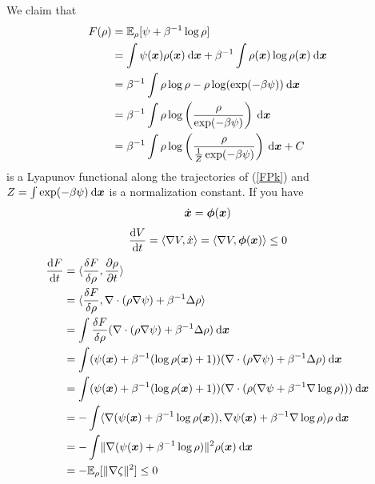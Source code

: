 \documentclass[11pt,twoside,a4paper]{article}
\begin{document}
We claim that 
\begin{align}
    F(\rho) &= \mathbb{E}_{\rho}[\psi + \beta^{-1} \log \rho ] \nonumber \\ 
    & = \int \psi({\bm{x}}) \rho({\bm{x}}) \: {\rm{d}} {\bm{x}} + \beta^{-1}\int \rho({\bm{x}}) \log \rho({\bm{x}}) \: {\rm{d}} {\bm{x}} \nonumber \\
    & = \beta^{-1}\int \rho \log \rho-\rho \log( \exp (-\beta \psi)) \: {\rm{d}} {\bm{x}} \nonumber \\ 
    & = \beta^{-1} \int \rho \log \left( \frac{\rho}{\exp(-\beta \psi)} \right) \: {\rm{d}} {\bm{x}}  \nonumber \\ 
    & =  \beta^{-1} \int \rho \log \left( \frac{\rho}{\frac{1}{Z}\exp(-\beta \psi)} \right) \: {\rm{d}} {\bm{x}}  + C  \nonumber 
\end{align}
is a Lyapunov functional along the trajectories of (\ref{FPk}) and $Z= \int\exp(-\beta \psi) \: {\rm{d}} {\bm{x}}  $ is a normalization constant.
If you have 
\begin{align}
    \dot{{\bm{x}}} = \bm{\phi}({\bm{x}})
\end{align}
\begin{align}
    \frac{{\rm{d}} V}{{\rm{d}} t } = \langle \nabla V , \dot{x}\rangle =  \langle \nabla V , \bm{\phi}({\bm{x}}) \rangle  \leq 0
    \end{align} 
\begin{align}
\frac{{\rm{d}} F}{{\rm{d}} t} &= \langle \frac{\delta F}{\delta \rho }, \frac{\partial \rho  }{\partial t}\rangle \nonumber \\ 
& = \langle  \frac{\delta F}{\delta \rho }, \nabla \cdot (\rho \nabla \psi) + \beta^{-1}\Delta \rho  \rangle \nonumber  \\
& = \int  \frac{\delta F}{\delta \rho } (\nabla \cdot (\rho \nabla \psi) + \beta^{-1}\Delta \rho) \: {\rm{d}} {\bm{x}} \nonumber \\
& = \int (\psi({\bm{x}}) + \beta^{-1}(\log \rho({\bm{x}}) +1)) (\nabla \cdot (\rho \nabla \psi) + \beta^{-1}\Delta \rho)\: {\rm{d}} {\bm{x}}  \nonumber \\
& = \int (\psi({\bm{x}}) + \beta^{-1}(\log \rho({\bm{x}}) +1)) (\nabla \cdot (\rho ( \nabla \psi + \beta^{-1}\nabla \log \rho)))\: {\rm{d}} {\bm{x}} \nonumber \\
&= - \int  \langle \nabla (\psi({\bm{x}}) + \beta^{-1} \log \rho ({\bm{x}})), \nabla \psi({\bm{x}}) + \beta^{-1} \nabla \log \rho  \rangle \rho \: {\rm{d}} {\bm{x}} \nonumber \\
& = -\int \lVert \nabla (\psi({\bm{x}}) + \beta^{-1} \log \rho )\rVert^2 \rho({\bm{x}}) \: {\rm{d}} {\bm{x}}  \nonumber  \\
&=- \mathbb{E}_{\rho}[\lVert \nabla \zeta \rVert^2] \leq 0
 \end{align}
\end{document}
